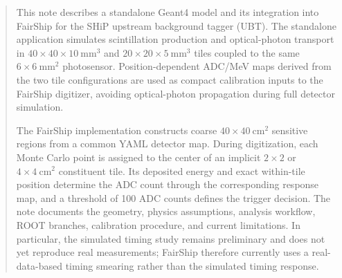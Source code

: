 \begin{titlepage}
\begin{abstract}
\noindent
This note describes a standalone Geant4 model and its integration into
FairShip for the SHiP upstream background tagger (UBT).  The standalone
application simulates scintillation production and optical-photon transport
in \(40\times40\times10~\mathrm{mm^3}\) and
\(20\times20\times5~\mathrm{mm^3}\) tiles coupled to the same
\(6\times6~\mathrm{mm^2}\) photosensor. Position-dependent ADC/MeV maps derived from
the two tile configurations are used as compact calibration inputs to the
FairShip digitizer, avoiding optical-photon propagation during full detector
simulation.

The FairShip implementation constructs coarse \(40\times40~\mathrm{cm^2}\)
sensitive regions from a common YAML detector map.  During digitization, each
Monte Carlo point is assigned to the center of an implicit \(2\times2\) or
\(4\times4~\mathrm{cm^2}\) constituent tile.  Its deposited energy and exact
within-tile position determine the ADC count through the corresponding
response map, and a threshold of 100 ADC counts defines the trigger decision.
The note documents the geometry, physics assumptions, analysis workflow,
ROOT branches, calibration procedure, and current limitations.  In
particular, the simulated timing study remains preliminary and does not yet
reproduce real measurements; FairShip therefore currently uses a
real-data-based timing smearing rather than the simulated timing response.
\end{abstract}

\vspace*{2.0cm}
\vspace{\fill}

\end{titlepage}





